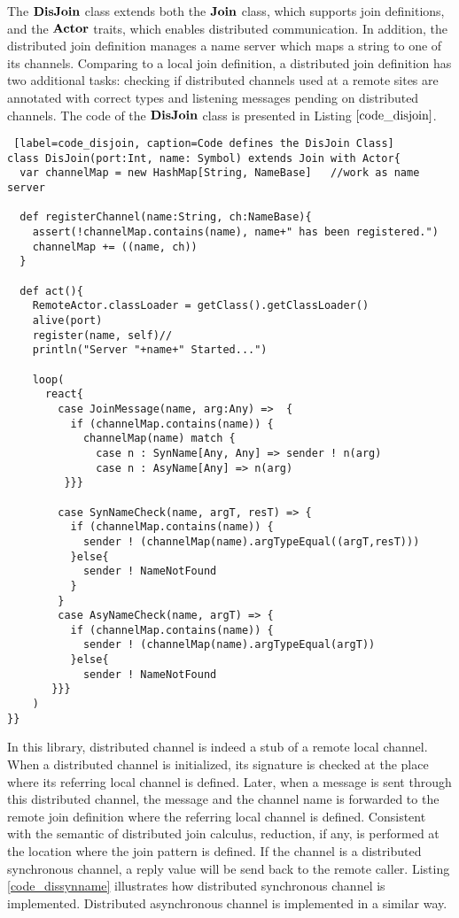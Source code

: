 The $\bf{DisJoin}$ class extends both the $\bf{Join}$ class, which supports join definitions, and the $\bf{Actor}$ traits, which enables distributed communication.  In addition, the distributed join definition manages a name server which maps a string to one of its channels.  Comparing to a local join definition, a distributed join definition has two additional tasks: checking if distributed channels used at a remote sites are annotated with correct types and listening messages pending on distributed channels.  The code of the $\bf{DisJoin}$ class is presented in Listing $\ref{code_disjoin}$.


\begin{lstlisting} [label=code_disjoin, caption=Code defines the DisJoin Class]
class DisJoin(port:Int, name: Symbol) extends Join with Actor{
  var channelMap = new HashMap[String, NameBase]   //work as name server
  
  def registerChannel(name:String, ch:NameBase){
    assert(!channelMap.contains(name), name+" has been registered.")
    channelMap += ((name, ch))
  }  
  
  def act(){
    RemoteActor.classLoader = getClass().getClassLoader()
    alive(port)
    register(name, self)//
    println("Server "+name+" Started...")
    
    loop(
      react{
        case JoinMessage(name, arg:Any) =>  {
          if (channelMap.contains(name)) {
            channelMap(name) match {
              case n : SynName[Any, Any] => sender ! n(arg)
              case n : AsyName[Any] => n(arg)
         }}}

        case SynNameCheck(name, argT, resT) => {
          if (channelMap.contains(name)) {
            sender ! (channelMap(name).argTypeEqual((argT,resT)))
          }else{
            sender ! NameNotFound
          }
        }
        case AsyNameCheck(name, argT) => {
          if (channelMap.contains(name)) {
            sender ! (channelMap(name).argTypeEqual(argT))
          }else{
            sender ! NameNotFound
       }}}
    )
}}
\end{lstlisting}

In this library, distributed channel is indeed a stub of a remote local channel.  When a distributed channel is initialized, its signature is checked at the place where its referring local channel is defined.  Later, when a message is sent through this distributed channel, the message and the channel name is forwarded to the remote join definition where the  referring local channel is defined.  Consistent with the semantic of distributed join calculus, reduction, if any, is performed at the location where the join pattern is defined.  If the channel is a distributed synchronous channel, a reply value will be send back to the remote caller.  Listing \ref{code_dissynname} illustrates how distributed synchronous channel is implemented.  Distributed asynchronous channel is implemented in a similar way.  


